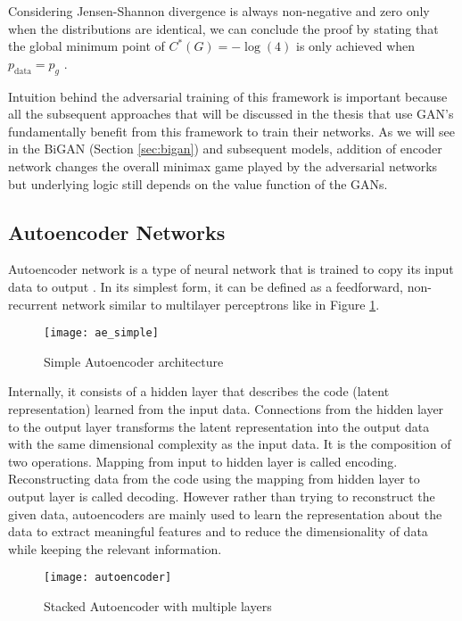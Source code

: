 Considering Jensen-Shannon divergence is always non-negative and zero only when the distributions
are identical, we can conclude the proof by stating that the global minimum point of $C^*(G) = -
\log(4)$ is only achieved when $p_{\text{data}} = p_g$ .

Intuition behind the adversarial training of this framework is important because all the subsequent
approaches that will be discussed in the thesis that use GAN's fundamentally benefit from this
framework to train their networks. As we will see in the BiGAN (Section \ref{sec:bigan}) and subsequent models, addition of
encoder network changes the overall minimax game played by the adversarial networks but underlying
logic still depends on the value function of the GANs.

\subsection{Autoencoder Networks}
\label{sec:ae}
 
Autoencoder network is a type of neural network that is trained to copy its input data to output
\cite{Goodfellow-et-al-2016}. In its simplest form, it can be defined as a feedforward, 
non-recurrent network similar to multilayer perceptrons like in Figure \ref{fig:ae_simple}.
\begin{figure}[h!]
	\centering
	\texttt{[image: ae\_simple]}
    \caption{Simple Autoencoder architecture}
    \label{fig:ae_simple}
\end{figure}

Internally, it consists of a hidden layer that describes the code (latent representation) 
learned from the input data. Connections from the hidden layer to the output layer transforms 
the latent representation into the output data with the same dimensional complexity as the input 
data. It is the composition of two operations. Mapping from input to hidden layer is called encoding. 
Reconstructing data from the code using the mapping from hidden layer to output layer is called 
decoding. However rather than trying to reconstruct the given data, autoencoders are mainly used 
to learn the representation about the data to extract meaningful features and to reduce the 
dimensionality of data while keeping the relevant information.

\begin{figure}[h!]
	\centering
	\texttt{[image: autoencoder]}
    \caption{Stacked Autoencoder with multiple layers}
    \label{fig:ae_deep}
\end{figure}

